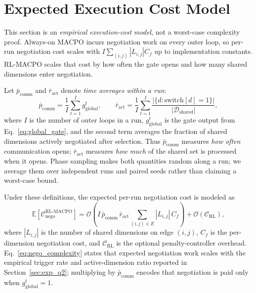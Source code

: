 \documentclass[conference]{IEEEtran}
\begin{document}
\section{Expected Execution Cost Model}\label{sec:complexity}\label{sec:exec_cost}
This section is an \emph{empirical execution-cost model}, not a worst-case complexity proof. Always-on MACPO incurs negotiation work on every outer loop, so per-run negotiation cost scales with $I\sum_{(i,j)}|L_{i,j}|C_f$ up to implementation constants. RL-MACPO scales that cost by how often the gate opens and how many shared dimensions enter negotiation.

Let $\bar p_{\mathrm{comm}}$ and $\bar r_{\mathrm{act}}$ denote \emph{time averages within a run}:
\begin{equation}
\bar p_{\mathrm{comm}}=\frac{1}{I}\sum_{t=1}^{I} g_{\mathrm{global}}^t,
\qquad
\bar r_{\mathrm{act}}=\frac{1}{I}\sum_{t=1}^{I}\frac{|\{d:\mathrm{switch}[d]=1\}|}{|\mathcal{D}_{\mathrm{shared}}|},
\label{eq:empirical_averages}
\end{equation}
where $I$ is the number of outer loops in a run, $g_{\mathrm{global}}^t$ is the gate output from Eq.~\eqref{eq:global_gate}, and the second term averages the fraction of shared dimensions actively negotiated after selection. Thus $\bar p_{\mathrm{comm}}$ measures \emph{how often} communication opens; $\bar r_{\mathrm{act}}$ measures \emph{how much} of the shared set is processed when it opens. Phase sampling makes both quantities random along a run; we average them over independent runs and paired seeds rather than claiming a worst-case bound.

Under these definitions, the expected per-run negotiation cost is modeled as
\begin{equation}
\mathbb{E}\!\left[\mathcal{C}_{\mathrm{nego}}^{\mathrm{RL\mbox{-}MACPO}}\right]
=
\mathcal{O}\!\left(
I\,\bar p_{\mathrm{comm}}\,\bar r_{\mathrm{act}}
\sum_{(i,j)\in E}|L_{i,j}|\,C_f
\right)
+\mathcal{O}(\mathcal{C}_{\mathrm{RL}}),
\label{eq:nego_complexity}
\end{equation}
where $|L_{i,j}|$ is the number of shared dimensions on edge $(i,j)$, $C_f$ is the per-dimension negotiation cost, and $\mathcal{C}_{\mathrm{RL}}$ is the optional penalty-controller overhead. Eq.~\eqref{eq:nego_complexity} states that expected negotiation work scales with the empirical trigger rate and active-dimension ratio reported in Section~\ref{sec:exp_q2}; multiplying by $\bar p_{\mathrm{comm}}$ encodes that negotiation is paid only when $g_{\mathrm{global}}^t{=}1$.
\end{document}
